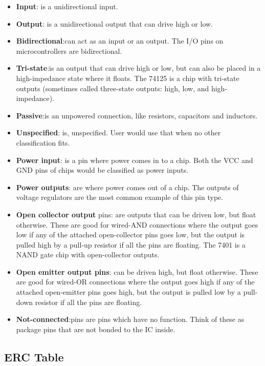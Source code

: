 \begin{itemize}

\item {\textbf {Input}}: is a unidirectional input.
\item {\textbf {Output}}: is a unidirectional output that can drive high or low.
\item {\textbf {Bidirectional}}:can act as an input or an output. The I/O pins on microcontrollers are bidirectional.
\item {\textbf {Tri-state}}:is an output that can drive high or low, but can also be placed in a high-impedance state where it floats. The 74125 is a chip with tri-state outputs (sometimes called three-state outputs: high, low, and high-impedance).
\item {\textbf {Passive}}:is an unpowered connection, like resistors, capacitors and inductors.
\item {\textbf{Unspecified}}: is, unspecified. User would use that when no other classification fits.
\item {\textbf{Power input}}: is a pin where power comes in to a chip. Both the VCC and GND pins of chips would be classified as power inputs.
\item {\textbf {Power outputs}}: are where power comes out of a chip. The outputs of voltage regulators are the most common example of this pin type.
\item {\textbf {Open collector output}} pins: are outputs that can be driven low, but float 	otherwise. These are good for wired-AND connections where the output 	goes low if any of the attached open-collector pins goes low, but 	the output is pulled high by a pull-up resistor if all the pins are floating. The 7401 is a NAND gate chip with open-collector outputs.
\item {\textbf{Open emitter output pins}}: can be driven high, but float otherwise. These 	are good for wired-OR connections where the output goes high if any 	of the attached open-emitter pins goes high, but the output is pulled low by a pull-down resistor if all the pins are floating.
\item {\textbf{ Not-connected}}:pins are pins which have no function. Think of these as package pins that are not bonded to the IC inside.
 \end{itemize}

\subsection{ERC Table}


